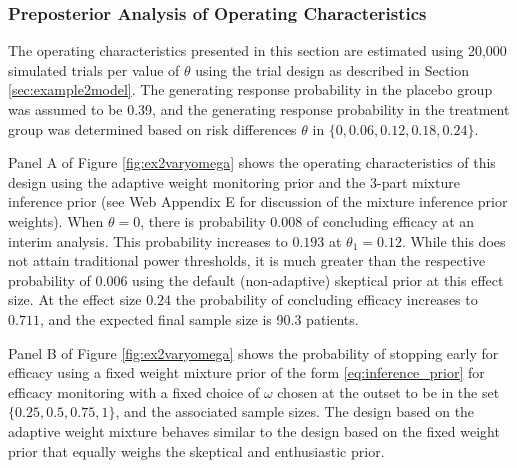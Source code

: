 \documentclass[AMA,STIX1COL,doublespace]{WileyNJD-v2}
\begin{document}
\subsubsection{Preposterior Analysis of Operating Characteristics}\label{sec:ex2operatingcharacteristics} 
The operating characteristics presented in this section are estimated using 20,000 simulated trials per value of $\theta$ using the trial design as described in Section \ref{sec:example2model}. The generating response probability in the placebo group was assumed to be 0.39, and the generating response probability in the treatment group was determined based on risk differences $\theta$ in $\{0, 0.06, 0.12, 0.18, 0.24\}$.

Panel A of Figure \ref{fig:ex2varyomega} shows the operating characteristics of this design using the adaptive weight monitoring prior and the 3-part mixture inference prior (see Web Appendix E for discussion of the mixture inference prior weights). 
%
When $\theta=0$, there is probability 0.008 of concluding efficacy at an interim analysis.
%
This probability increases to $0.193$ at $\theta_1=0.12$. While this does not attain traditional power thresholds, it is much greater than the respective probability of 0.006 using the default (non-adaptive) skeptical prior at this effect size.
%
At the effect size $0.24$ the probability of concluding efficacy increases to $0.711$, and the expected final sample size is 90.3 patients.

Panel B of Figure \ref{fig:ex2varyomega} shows the probability of stopping early for efficacy using a fixed weight mixture prior of the form \eqref{eq:inference_prior}  for efficacy monitoring with a fixed choice of $\omega$ chosen at the outset to be in the set $\{0.25,0.5,0.75,1\}$, and the associated sample sizes.
%
%
The design based on the adaptive weight mixture behaves similar to the design based on the fixed weight prior that equally weighs the skeptical and enthusiastic prior.
\end{document}
